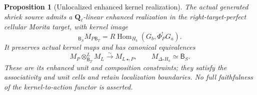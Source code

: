 \documentclass[11pt]{article}
\newtheorem{proposition}{Proposition}[section]
\theoremstyle{definition}
\theoremstyle{remark}
\newcommand{\Q}{\mathbf Q_\ell}
\newcommand{\RHom}{R\operatorname{Hom}}
\begin{document}
\begin{proposition}[Unlocalized enhanced kernel realization]
\label{thm:kernel-morita}
The actual generated shriek source admits a $\Q$-linear enhanced
realization in the right-target-perfect cellular Morita target,
with kernel image
\[
 {}_{\mathsf B_S}M_P{}_{\mathsf B_T}
       =\RHom_{H_b}(G_b,\Phi_P^!G_a).
\]
It preserves actual kernel maps and has canonical equivalences
\begin{equation}
 M_P\otimes_{\mathsf B_T}^LM_L
       \xrightarrow{\sim}M_{L\star_!P},\qquad
 M_{\Delta_*H_a}\simeq\mathsf B_S.
 \label{eq:morita-convolution}
\end{equation}
These are its enhanced unit and composition constraints; they satisfy
the associativity and unit cells and retain localization boundaries.
No full faithfulness of the kernel-to-action functor is asserted.
\end{proposition}
\end{document}
